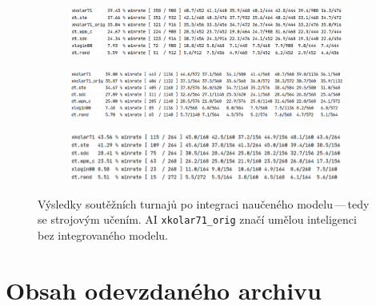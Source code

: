 \documentclass[11pt, a4paper]{article}
\theoremstyle{definition}
\begin{document}
\begin{figure}[H]
    \centering
    \begin{subfigure}{\textwidth}
        \centering
        \includegraphics[width=\linewidth]{tournament-nn-1.png}
        \vspace{0mm}
    \end{subfigure}
    \begin{subfigure}{\textwidth}
        \centering        
        \includegraphics[width=\linewidth]{tournament-nn-2.png}
        \vspace{0mm}
    \end{subfigure}
    \begin{subfigure}{\textwidth}
        \centering
        \includegraphics[width=\linewidth]{tournament-nn-3.png}
    \end{subfigure}
    \caption{Výsledky soutěžních turnajů po integraci naučeného modelu\,---\,tedy se strojovým učením.
    AI \texttt{xkolar71\_orig} značí umělou inteligenci bez integrovaného modelu.}
    \label{fig:vysledky-turnaje-s-modelem}
\end{figure}

\section{Obsah odevzdaného archivu}
\label{sec:files}
\end{document}
